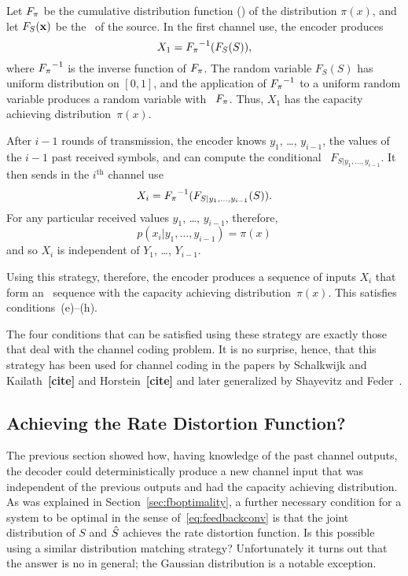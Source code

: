 Let ${F_{\pi}}$ be the cumulative distribution function (\cdf) of the distribution
$\pi(x)$, and let $F_S(\mathbf{x})$ be the \cdf\ of the source. In the first channel
use, the encoder produces
\begin{equation*}
  X_1 = {F_{\pi}}^{-1}(F_S(S)),
\end{equation*}
where ${F_{\pi}}^{-1}$ is the inverse function of ${F_{\pi}}$. The random variable
$F_S(S)$ has uniform distribution on $[0,1]$, and the application of ${F_{\pi}}^{-1}$
to a uniform random variable produces a random variable with \cdf\ ${F_{\pi}}$. Thus,
$X_1$ has the capacity achieving distribution~$\pi(x)$. 

After $i-1$ rounds of transmission, the encoder knows $y_1$, \ldots, $y_{i-1}$,
the values of the $i-1$ past received symbols, and can compute the conditional
\cdf\ $F_{S|y_1, \ldots, y_{i-1}}$. It then sends in the $i^{\text{th}}$ channel
use
\begin{equation}
  \label{eq:posteriorxi}
  X_i = {F_{\pi}}^{-1}(F_{S|y_1,\dots,y_{i-1}}(S)).
\end{equation}
For any particular received values $y_1$, \ldots, $y_{i-1}$, therefore,
\begin{equation*}
  p(x_i|y_1, \dots, y_{i-1}) = \pi(x)
\end{equation*}
and so $X_i$ is independent of $Y_1$, \ldots, $Y_{i-1}$. 

Using this strategy, therefore, the encoder produces a sequence of inputs $X_i$
that form an \iid\ sequence with the capacity achieving distribution~$\pi(x)$.
This satisfies conditions~(e)--(h). 

The four conditions that can be satisfied using these strategy are exactly those
that deal with the channel coding problem. It is no surprise, hence, that this
strategy has been used for channel coding in the papers by Schalkwijk and
Kailath~\textbf{[cite]} and Horstein~\textbf{[cite]} and later generalized by
Shayevitz and Feder~\cite{ShayevitzF2007,ShayevitzF2008}.


\subsection{Achieving the Rate Distortion Function?}

The previous section showed how, having knowledge of the past channel outputs,
the decoder could deterministically produce a new channel input that was
independent of the previous outputs and had the capacity achieving distribution.
As was explained in Section~\ref{sec:fboptimality}, a further necessary
condition for a system to be optimal in the sense of~\eqref{eq:feedbackconv} is
that the joint distribution of $S$ and ${\hat{S}}$ achieves the rate distortion
function. Is this possible using a similar distribution matching strategy?
Unfortunately it turns out that the answer is no in general; the Gaussian
distribution is a notable exception.

